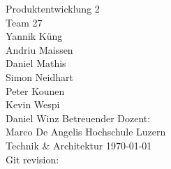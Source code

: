     \begin{titlepage}
        \begin{center}
            \makeatletter
            {\Large Produktentwicklung 2} \\
            \vfill{}
            {\LARGE \@title}
            \vfill{}
            {Team 27 \\
            Yannik Küng \\
            Andriu Maissen \\
            Daniel Mathis \\
            Simon Neidhart \\
            Peter Kounen \\
            Kevin Wespi \\
            Daniel Winz}
            \vfill{}
            {Betreuender Dozent: \\
            Marco De Angelis}
            \vfill{}
            {Hochschule Luzern \\
            Technik \& Architektur}
            \vfill
            {\today \\
            Git revision: 
            }
            \makeatother
        \end{center}
    \end{titlepage}
